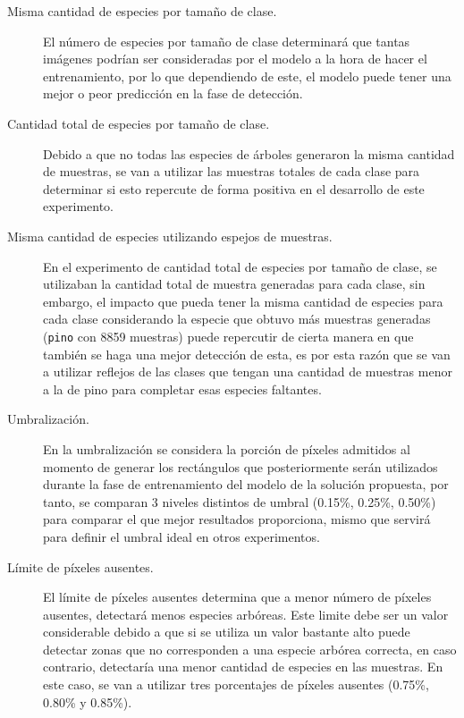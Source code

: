 \begin{description}
\item[Misma cantidad de especies por tamaño de clase.]{El número de especies por tamaño de clase determinará que tantas imágenes podrían ser consideradas por el modelo a la hora de hacer el entrenamiento, por lo que dependiendo de este, el modelo puede tener una mejor o peor predicción en la fase de detección.} 
\end{description}

\begin{description}
\item[Cantidad total de especies por tamaño de clase.]{Debido a que no todas las especies de árboles generaron la misma cantidad de muestras, se van a utilizar las muestras totales de cada clase para determinar si esto repercute de forma positiva en el desarrollo de este experimento.}
\end{description}

\begin{description}
\item[Misma cantidad de especies utilizando espejos de muestras.]{En el experimento de cantidad total de especies por tamaño de clase, se utilizaban la cantidad total de muestra generadas para cada clase, sin embargo, el impacto que pueda tener la misma cantidad de especies para cada clase considerando la especie que obtuvo más muestras generadas (\texttt{pino} con 8859 muestras) puede repercutir de cierta manera en que también se haga una mejor detección de esta, es por esta razón que se van a utilizar reflejos de las clases que tengan una cantidad de muestras menor a la de pino para completar esas especies faltantes.}
\end{description}

\begin{description}
\item[Umbralización.]{En la umbralización se considera la porción de píxeles admitidos al momento de generar los rectángulos que posteriormente serán utilizados durante la fase de entrenamiento del modelo de la solución propuesta, por tanto, se comparan 3 niveles distintos de umbral  (0.15\%, 0.25\%, 0.50\%) para comparar el que mejor resultados proporciona, mismo que servirá para definir el umbral ideal en otros experimentos.} 
\end{description}

\begin{description}
\item[Límite de píxeles ausentes.]{El límite de píxeles ausentes determina que a menor número de píxeles ausentes, detectará menos especies arbóreas. Este limite debe ser un valor considerable debido a que si se utiliza un valor bastante alto puede detectar zonas que no corresponden a una especie arbórea correcta,  en caso contrario, detectaría una menor cantidad de especies en las muestras. En este caso, se van a utilizar tres porcentajes de píxeles ausentes (0.75\%, 0.80\% y 0.85\%).}
\end{description}

